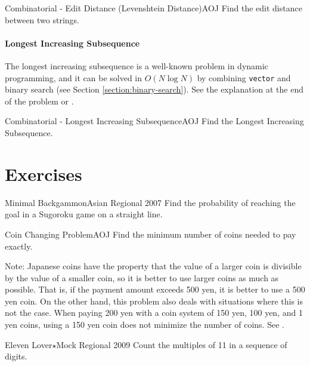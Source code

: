 \begin{pbox}{Combinatorial - Edit Distance (Levenshtein Distance)}{AOJ}
  Find the edit distance between two strings.
  
\end{pbox}


\paragraph{Longest Increasing Subsequence}
The longest increasing subsequence is a well-known problem in dynamic programming, and it can be solved in $O(N\log N)$ by combining \texttt{vector} and binary search (see Section \ref{section:binary-search}). See the explanation at the end of the problem or \pcaojbook[pp.~421--].

\begin{pbox}{Combinatorial - Longest Increasing Subsequence}{AOJ}
  Find the Longest Increasing Subsequence.

\end{pbox}
\section{Exercises}

\begin{pbox}{Minimal Backgammon}{Asian Regional 2007}
Find the probability of reaching the goal in a Sugoroku game on a straight line.
  
\end{pbox}

\begin{pbox}{Coin Changing Problem}{AOJ}
Find the minimum number of coins needed to pay exactly.

\end{pbox}
Note: Japanese coins have the property that the value of a larger coin is divisible by the value of a smaller coin, so it is better to use larger coins as much as possible. That is, if the payment amount exceeds 500 yen, it is better to use a 500 yen coin. On the other hand, this problem also deals with situations where this is not the case. When paying 200 yen with a coin system of 150 yen, 100 yen, and 1 yen coins, using a 150 yen coin does not minimize the number of coins.
See \pcaojbook[pp.~412--].

\begin{pbox}{Eleven Lover$\star$}{Mock Regional 2009}
Count the multiples of 11 in a sequence of digits.
  
\end{pbox}

